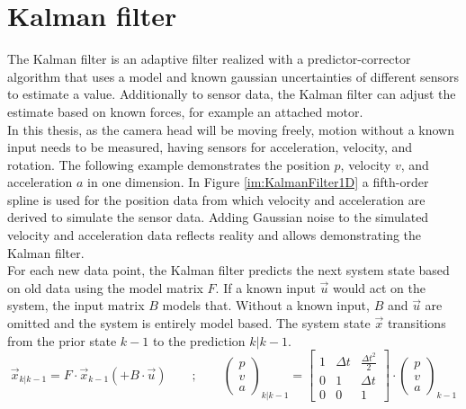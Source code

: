 \section{Kalman filter}
\label{sec:Kalmanfilter}
The Kalman filter is an adaptive filter realized with a predictor-corrector algorithm that uses a model and known gaussian uncertainties of different sensors to estimate a value. Additionally to sensor data, the Kalman filter can adjust the estimate based on known forces, for example an attached motor.\\
In this thesis, as the camera head will be moving freely, motion without a known input needs to be measured, having sensors for acceleration, velocity, and rotation. The following example demonstrates the position $p$, velocity $v$, and acceleration $a$ in one dimension. In Figure \ref{im:KalmanFilter1D} a fifth-order spline is used for the position data from which velocity and acceleration are derived to simulate the sensor data. Adding Gaussian noise to the simulated velocity and acceleration data reflects reality and allows demonstrating the Kalman filter.\\
For each new data point, the Kalman filter predicts the next system state based on old data using the model matrix $F$. If a known input $\vec{u}$ would act on the system, the input matrix $B$ models that. Without a known input, $B$ and $\vec{u}$ are omitted and the system is entirely model based. The system state $\vec{x}$ transitions from the prior state $k-1$ to the prediction $k|k-1$. 
\begin{equation*}
    \vec{x}_{k|k-1} = 
    F
    \cdot
    \vec{x}_{k-1}
    (+
    B
    \cdot
    \vec{u}) \qquad ; \qquad
    \begin{pmatrix}
        p  \\
        v  \\
        a 
    \end{pmatrix}_{k|k-1} = 
    \begin{bmatrix}
        1 & \Delta t & \frac{\Delta t^{2}}{2} \\
        0 & 1 & \Delta t \\
        0 & 0 & 1
    \end{bmatrix}
    \cdot
    \begin{pmatrix}
        p  \\
        v  \\
        a 
    \end{pmatrix}_{k-1}    
\end{equation*}

